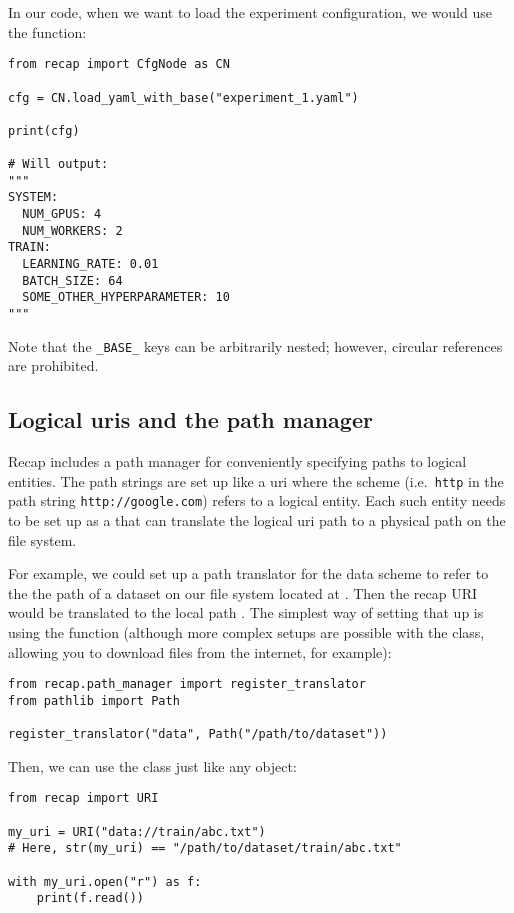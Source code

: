 \documentclass[../../report.tex]{subfiles}
\begin{document}
In our code, when we want to load the experiment configuration, we would use the  function:

\begin{verbatim}
from recap import CfgNode as CN

cfg = CN.load_yaml_with_base("experiment_1.yaml")

print(cfg)

# Will output:
"""
SYSTEM:
  NUM_GPUS: 4
  NUM_WORKERS: 2
TRAIN:
  LEARNING_RATE: 0.01
  BATCH_SIZE: 64
  SOME_OTHER_HYPERPARAMETER: 10
"""
\end{verbatim}
Note that the \texttt{_BASE_} keys can be arbitrarily nested;
however, circular references are prohibited.

\subsection{Logical \acsp{uri} and the path manager}
Recap includes a path manager for conveniently specifying paths to logical entities.
The path strings are set up like a \gls{uri} where the scheme (i.e.\ \texttt{http} in the path string \texttt{http://google.com}) refers to a logical entity.
Each such entity needs to be set up as a  that can translate the logical \gls{uri} path to a physical path on the file system.

For example, we could set up a path translator for the data scheme to refer to the the path of a dataset on our file system located at . Then the recap URI  would be translated to the local path .
The simplest way of setting that up is using the  function (although more complex setups are possible with the  class, allowing you to download files from the internet, for example):

\begin{verbatim}
from recap.path_manager import register_translator
from pathlib import Path

register_translator("data", Path("/path/to/dataset"))
\end{verbatim}
Then, we can use the  class just like any  object:
\begin{verbatim}
from recap import URI

my_uri = URI("data://train/abc.txt")
# Here, str(my_uri) == "/path/to/dataset/train/abc.txt"

with my_uri.open("r") as f:
    print(f.read())
\end{verbatim}
\end{document}
